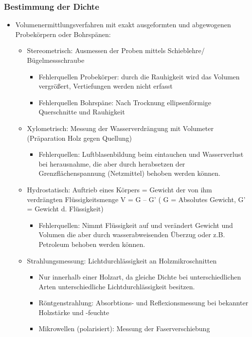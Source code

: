 \documentclass{article}
\begin{document}
\subsubsection{Bestimmung der Dichte}
\begin{itemize}
  \item Volumenermittlungsverfahren mit exakt ausgeformten und abgewogenen
  Probekörpern oder Bohrspänen:
  \begin{itemize}
    \item Stereometrisch: Ausmessen der Proben mittels Schieblehre/
    Bügelmessschraube
    \begin{itemize}
      \item Fehlerquellen Probekörper: durch die Rauhigkeit wird das Volumen
      vergrößert, Vertiefungen werden nicht erfasst
      \item Fehlerquellen Bohrspäne: Nach Trocknung ellipsenförmige
      Querschnitte und Rauhigkeit
    \end{itemize}
  \end{itemize}
  \begin{itemize}
    \item Xylometrisch: Messung der Wasserverdrängung mit Volumeter
    (Präparation Holz gegen Quellung)
    \begin{itemize}
      \item Fehlerquellen: Luftblasenbildung beim eintauchen und Wasserverlust
      bei herausnahme, die aber durch herabsetzen der Grenzflächenspannung
      (Netzmittel) behoben werden können.
    \end{itemize}
  \end{itemize}
  \begin{itemize}
    \item Hydrostatisch: Auftrieb  eines Körpers = Gewicht
    der von ihm verdrängten Flüssigkeitsmenge V = G – G' ( G = Absolutes
    Gewicht, G' = Gewicht d. Flüssigkeit)
    \begin{itemize}
      \item Fehlerquellen: Nimmt Flüssigkeit auf und verändert Gewicht und
      Volumen die aber durch wasserabweisenden Überzug oder z.B. Petroleum
      behoben werden können.
    \end{itemize}
  \end{itemize}
  \begin{itemize}
    \item Strahlungsmessung: Lichtdurchlässigkeit an Holzmikroschnitten
    \begin{itemize}
      \item Nur innerhalb einer Holzart, da gleiche Dichte bei
      unterschiedlichen Arten unterschiedliche Lichtdurchlässigkeit besitzen.
      \item Röntgenstrahlung: Absorbtions- und Reflexionsmessung bei bekannter
      Holzstärke und -feuchte
      \item Mikrowellen (polarisiert): Messung der Faserverschiebung
    \end{itemize}
  \end{itemize}
  
\end{itemize}
 
\end{document}
